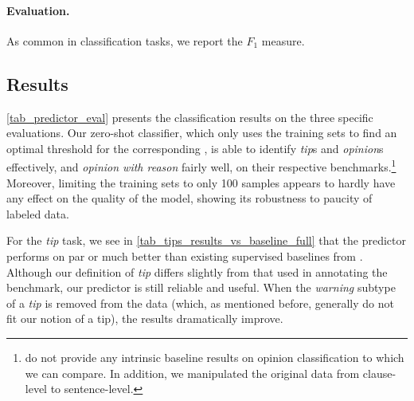 \paragraph{Evaluation.}
As common in classification tasks, we report the $F_1$ measure.





\subsection{Results}
\label{sec_appendix_experiments_specific_type_results}
\autoref{tab_predictor_eval} presents the classification results on the three specific \taxtype{} evaluations.
Our zero-shot classifier, which only uses the training sets to find an optimal threshold for the corresponding \taxtype{}, is able to identify \textit{tip}s and \textit{opinion}s effectively, and \textit{opinion with reason} fairly well, on their respective benchmarks.\footnote{\citet{chen2022argumentMiningForHelpfulness} do not provide any intrinsic baseline results on opinion classification to which we can compare. In addition, we manipulated the original data from clause-level to sentence-level.} Moreover, limiting the training sets to only 100 samples appears to hardly have any effect on the quality of the model, showing its robustness to paucity of labeled data.

For the \textit{tip} task, we see in \autoref{tab_tips_results_vs_baseline_full} that the predictor performs on par or much better than existing supervised baselines from \citet{hirsch2021producttips}. Although our definition of \emph{tip} differs slightly from that used in annotating the benchmark, our predictor is still reliable and useful.
When the \textit{warning} subtype of a \textit{tip} is removed from the data (which, as mentioned before, generally do not fit our notion of a tip), the results dramatically improve.













